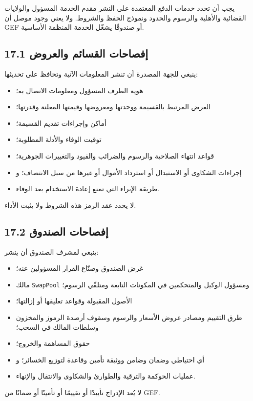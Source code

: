\documentclass[11pt]{article}
\begin{document}
يجب أن تحدد خدمات الدفع المعتمدة على النشر مقدم الخدمة المسؤول والولايات القضائية والأهلية والرسوم والحدود ونموذج الحفظ والشروط. ولا يعني وجود موصل أن GEF أو صندوقًا يشغّل الخدمة المنظمة الأساسية.

\subsection*{17.1 إفصاحات القسائم والعروض}

ينبغي للجهة المصدرة أن تنشر المعلومات الآتية وتحافظ على تحديثها:

\begin{itemize}[leftmargin=*]
\item هوية الطرف المسؤول ومعلومات الاتصال به؛
\item العرض المرتبط بالقسيمة ووحدتها ومعروضها وقيمتها المعلنة وقدرتها؛
\item أماكن وإجراءات تقديم القسيمة؛
\item توقيت الوفاء والأدلة المطلوبة؛
\item قواعد انتهاء الصلاحية والرسوم والضرائب والقيود والتغييرات الجوهرية؛
\item إجراءات الشكاوى أو الاستبدال أو استرداد الأموال أو غيرها من سبل الانتصاف؛ و
\item طريقة الإبراء التي تمنع إعادة الاستخدام بعد الوفاء.
\end{itemize}
لا يحدد عقد الرمز هذه الشروط ولا يثبت الأداء.

\subsection*{17.2 إفصاحات الصندوق}

ينبغي لمشرف الصندوق أن ينشر:

\begin{itemize}[leftmargin=*]
\item غرض الصندوق وصنّاع القرار المسؤولين عنه؛
\item مالك \texttt{SwapPool} ومسؤول الوكيل والمتحكمين في المكونات التابعة ومتلقّي الرسوم؛
\item الأصول المقبولة وقواعد تعليقها أو إزالتها؛
\item طرق التقييم ومصادر عروض الأسعار والرسوم وسقوف أرصدة الرموز والمخزون وسلطات المالك في السحب؛
\item حقوق المساهمة والخروج؛
\item أي احتياطي وضمان وضامن ووثيقة تأمين وقاعدة لتوزيع الخسائر؛ و
\item عمليات الحوكمة والترقية والطوارئ والشكاوى والانتقال والإنهاء.
\end{itemize}
لا يُعد الإدراج تأييدًا أو تقييمًا أو تأمينًا أو ضمانًا من GEF.
\end{document}
